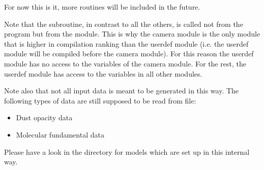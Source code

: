 \documentclass[letterpaper,10pt,english]{sphinxmanual}
\begin{document}
For now this is it, more routines will be included in the future.

Note that the  subroutine, in contrast to all the
others, is called not from the  program but from the
 module. This is why the camera module is the only module
that is higher in compilation ranking than the userdef module (i.e. the userdef
module will be compiled before the camera module). For this reason the userdef
module has no access to the variables of the camera module. For the rest, the
userdef module has access to the variables in all other modules.

Note also that not all input data is meant to be generated in this way. The
following types of data are still supposed to be read from file:
\begin{itemize}
\item {} 
Dust opacity data

\item {} 
Molecular fundamental data

\end{itemize}

Please have a look in the  directory for models
which are set up in this internal way.
\end{document}
